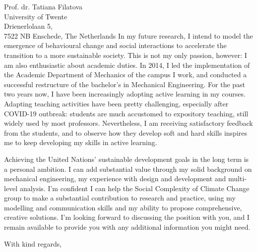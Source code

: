 \documentclass[sender,
    paper=a4,
    version=last,
    fontsize=12pt,
    DIV=12,
    BCOR=0mm]{scrlttr2}
\begin{document}
\begin{letter}{
    Prof. dr. Tatiana Filatova \\
    University of Twente\\
    Drienerlolaan 5, \\
    7522 NB Enschede, The Netherlands
}
In my future research, I intend to model the emergence of behavioural change and social interactions to accelerate the transition to a more sustainable society. This is not my only passion, however: I am also enthusiastic about academic duties. In 2014, I led the implementation of the Academic Department of Mechanics of the campus I work, and conducted a successful restructure of the bachelor's in Mechanical Engineering. For the past two years now, I have been increasingly adopting active learning in my courses. Adapting teaching activities have been pretty challenging, especially after COVID-19 outbreak: students are much accustomed to expository teaching, still widely used by most professors. Nevertheless, I am receiving satisfactory feedback from the students, and to observe how they develop soft and hard skills inspires me to keep developing my skills in active learning. 

Achieving the United Nations' sustainable development goals in the long term is a personal ambition. I can add substantial value through my solid background on mechanical engineering, my experience with design and development and multi-level analysis. I'm confident I can help the Social Complexity of Climate Change group to make a substantial contribution to research and practice, using my modelling and communication skills and my ability to propose comprehensive, creative solutions. I’m looking forward to discussing the position with you, and I remain available to provide you with any additional information you might need.

\closing{With kind regards,} %
\end{letter}
\end{document}
